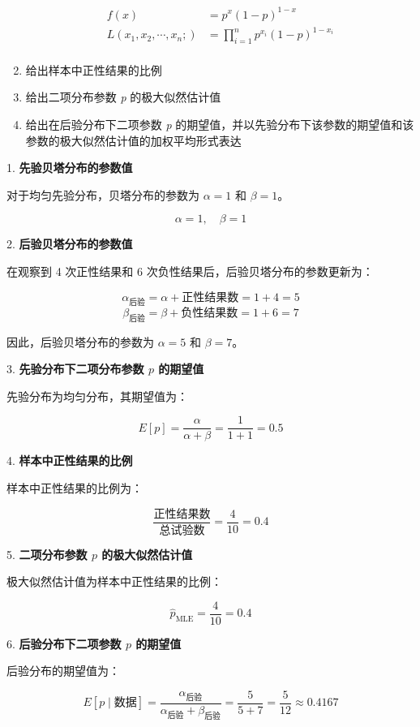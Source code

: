 \documentclass[stu,12pt,floatsintext]{apa7} %
\begin{document}
\begin{enumerate}[itemsep=2pt,topsep=0pt,parsep=0pt,label=(\alph*)]
    \begin{align}
        f(x) & = p^x(1-p)^{1-x} \\
        L(x_1, x_2, \cdots, x_n; ) & = \prod_{i=1}^{n} p^{x_i}(1-p)^{1-x_i} \\
    \end{align}

    \item 给出样本中正性结果的比例
    
    \item  给出二项分布参数 \textit{p} 的极大似然估计值
    
    \item  给出在后验分布下二项参数 \textit{p} 的期望值，并以先验分布下该参数的期望值和该参数的极大似然估计值的加权平均形式表达

\end{enumerate}


1. \textbf{先验贝塔分布的参数值}

对于均匀先验分布，贝塔分布的参数为 \(\alpha = 1\) 和 \(\beta = 1\)。

\[
\alpha = 1, \quad \beta = 1
\]

2. \textbf{后验贝塔分布的参数值}

在观察到 4 次正性结果和 6 次负性结果后，后验贝塔分布的参数更新为：

\[
\alpha_{\text{后验}} = \alpha + \text{正性结果数} = 1 + 4 = 5
\]
\[
\beta_{\text{后验}} = \beta + \text{负性结果数} = 1 + 6 = 7
\]

因此，后验贝塔分布的参数为 \(\alpha = 5\) 和 \(\beta = 7\)。

3. \textbf{先验分布下二项分布参数 \(p\) 的期望值}

先验分布为均匀分布，其期望值为：

\[
E[p] = \frac{\alpha}{\alpha + \beta} = \frac{1}{1 + 1} = 0.5
\]

4. \textbf{样本中正性结果的比例}

样本中正性结果的比例为：

\[
\frac{\text{正性结果数}}{\text{总试验数}} = \frac{4}{10} = 0.4
\]

5. \textbf{二项分布参数 \(p\) 的极大似然估计值}

极大似然估计值为样本中正性结果的比例：

\[
\hat{p}_{\text{MLE}} = \frac{4}{10} = 0.4
\]

6. \textbf{后验分布下二项参数 \(p\) 的期望值}

后验分布的期望值为：

\[
E[p \mid \text{数据}] = \frac{\alpha_{\text{后验}}}{\alpha_{\text{后验}} + \beta_{\text{后验}}} = \frac{5}{5 + 7} = \frac{5}{12} \approx 0.4167
\]
\end{document}
